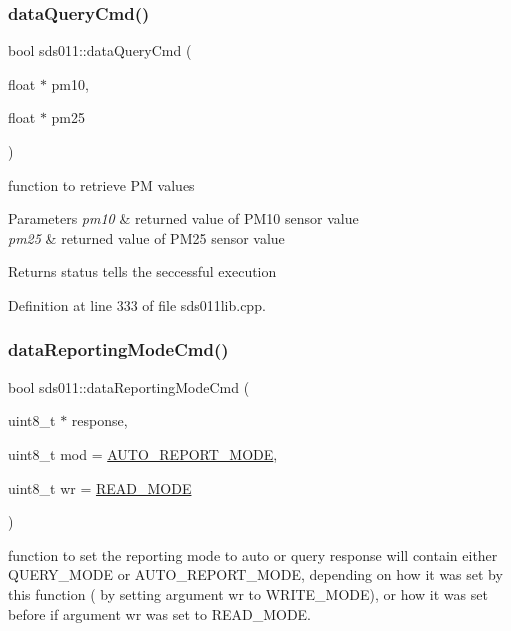 \subsubsection{\texorpdfstring{dataQueryCmd()}{dataQueryCmd()}}
{\footnotesize\ttfamily bool sds011\+::data\+Query\+Cmd (\begin{DoxyParamCaption}\item[{float $\ast$}]{pm10,  }\item[{float $\ast$}]{pm25 }\end{DoxyParamCaption})}



function to retrieve PM values 


\begin{DoxyParams}{Parameters}
{\em pm10} & returned value of P\+M10 sensor value \\
\hline
{\em pm25} & returned value of P\+M25 sensor value \\
\hline
\end{DoxyParams}
\begin{DoxyReturn}{Returns}
status tells the seccessful execution 
\end{DoxyReturn}


Definition at line 333 of file sds011lib.\+cpp.

\mbox{\label{classsds011_a5c5ba9739e019b5a877e5800d648a41f}} 
\subsubsection{\texorpdfstring{dataReportingModeCmd()}{dataReportingModeCmd()}}
{\footnotesize\ttfamily bool sds011\+::data\+Reporting\+Mode\+Cmd (\begin{DoxyParamCaption}\item[{uint8\+\_\+t $\ast$}]{response,  }\item[{uint8\+\_\+t}]{mod = {\ttfamily \mbox{\hyperlink{sds011lib_8h_aa7af1453a9caa4f85b40e2e386c741ba}{A\+U\+T\+O\+\_\+\+R\+E\+P\+O\+R\+T\+\_\+\+M\+O\+DE}}},  }\item[{uint8\+\_\+t}]{wr = {\ttfamily \mbox{\hyperlink{sds011lib_8h_a064cc7153fdb5596b2079d865dd9e055}{R\+E\+A\+D\+\_\+\+M\+O\+DE}}} }\end{DoxyParamCaption})}



function to set the reporting mode to auto or query response will contain either Q\+U\+E\+R\+Y\+\_\+\+M\+O\+DE or A\+U\+T\+O\+\_\+\+R\+E\+P\+O\+R\+T\+\_\+\+M\+O\+DE, depending on how it was set by this function ( by setting argument wr to W\+R\+I\+T\+E\+\_\+\+M\+O\+DE), or how it was set before if argument wr was set to R\+E\+A\+D\+\_\+\+M\+O\+DE. 


